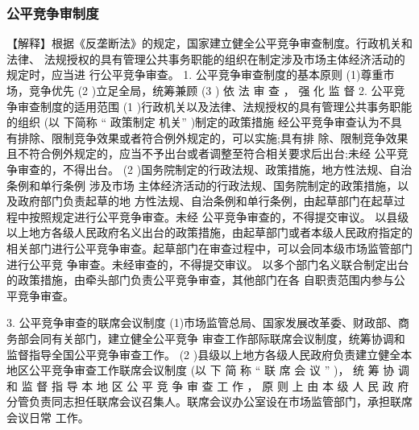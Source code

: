 \documentclass[UTF8,12pt]{ctexart}
\numberwithin{equation}{section} %
\numberwithin{figure}{section}
\numberwithin{table}{section}
\begin{document}
	\subsubsection{公平竞争审制度}
	【解释】根据《反垄断法》的规定，国家建立健全公平竞争审查制度。行政机关和法律、 法规授权的具有管理公共事务职能的组织在制定涉及市场主体经济活动的规定时，应当进 行公平竞争审查。
	1. 公平竞争审查制度的基本原则 (1)尊重市场，竞争优先
	(2 )立足全局，统筹兼顾
	(3 ) 依 法 审 查 ， 强 化 监 督
	2. 公平竞争审查制度的适用范围
	(1 )行政机关以及法律、法规授权的具有管理公共事务职能的组织 (以 下简称 “ 政策制定 机关” )制定的政策措施
	经公平竞争审查认为不具有排除、限制竞争效果或者符合例外规定的，可以实施;具有排 除、限制竞争效果且不符合例外规定的，应当不予出台或者调整至符合相关要求后出台;未经 公平竞争审查的，不得出台。
	(2 )国务院制定的行政法规、政策措施，地方性法规、自治条例和单行条例
	涉及市场 主体经济活动的行政法规、国务院制定的政策措施，以及政府部门负责起草的地 方性法规、自治条例和单行条例，由起草部门在起草过程中按照规定进行公平竞争审查。未经 公平竞争审查的，不得提交审议。 以县级以上地方各级人民政府名义出台的政策措施，由起草部门或者本级人民政府指定的 相关部门进行公平竞争审查。起草部门在审查过程中，可以会同本级市场监管部门进行公平竞 争审查。未经审查的，不得提交审议。 以多个部门名义联合制定出台的政策措施，由牵头部门负责公平竞争审查，其他部门在各 自职责范围内参与公平竞争审查。
	
	3. 公平竞争审查的联席会议制度 (1)市场监管总局、国家发展改革委、财政部、商务部会同有关部门，建立健全公平竞争 审查工作部际联席会议制度，统筹协调和监督指导全国公平竞争审查工作。
	(2 )县级以上地方各级人民政府负责建立健全本地区公平竞争审查工作联席会议制度 (以 下 简 称 “ 联 席 会 议 ” )， 统 筹 协 调 和 监 督 指 导 本 地 区 公 平 竞 争 审 查 工 作 ， 原 则 上 由 本 级 人 民 政 府分管负责同志担任联席会议召集人。联席会议办公室设在市场监管部门，承担联席会议日常 工作。
	
\end{document}
